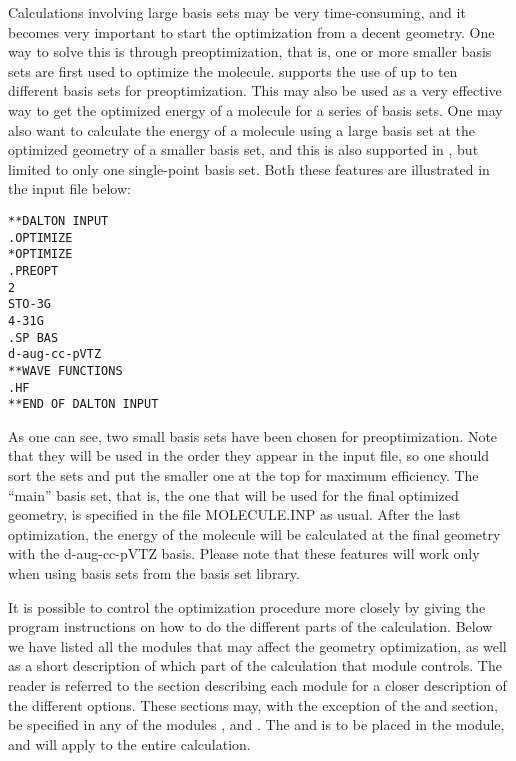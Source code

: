 Calculations involving large basis sets may be very time-consuming,
and it becomes very important to start the optimization from a decent
geometry. One way to solve this is through
preoptimization,
that is, one or more smaller basis sets are first used to optimize the
molecule.  supports the use of up to ten different
basis sets for preoptimization. This may also be used as a very
effective way to get the optimized energy of a molecule for a series
of basis sets. One may also want to calculate the energy of a molecule
using a large basis set at the optimized geometry of a smaller basis
set, and this is also supported in {\dalton}, but limited to only one
single-point basis set. Both these features are illustrated in the
input file below:

\begin{verbatim}
**DALTON INPUT
.OPTIMIZE
*OPTIMIZE
.PREOPT
2
STO-3G
4-31G
.SP BAS
d-aug-cc-pVTZ
**WAVE FUNCTIONS
.HF
**END OF DALTON INPUT
\end{verbatim}

As one can see, two small basis sets have been chosen 
for
preoptimization. Note that they will be
used in the order they appear in the input file, so one should
sort the sets and put the smaller one at the top for maximum
efficiency. The ``main'' basis set, that is, the one that will be
used for the final optimized geometry, is specified in the file
MOLECULE.INP as usual. After the last optimization, the energy of
the molecule will be calculated at the final geometry with the
d-aug-cc-pVTZ basis. Please note that these features will work only
when using basis sets from the basis set library.

It is possible to control the optimization procedure more closely
by giving the program instructions on how to do the different parts of
the calculation. Below we have listed all the modules that may
affect the geometry optimization, as well as a short description of
which part of the calculation that module controls. The reader is
referred to the section describing each module for a closer
description of the different options. These sections may, with the
exception of the  and  section, be specified
in any of the modules , 
and . The  and  is
to be placed in the  module, and will apply to the
entire calculation.

